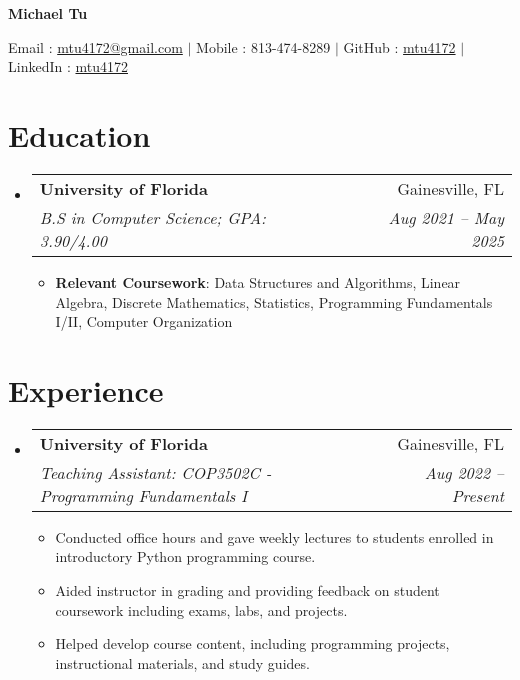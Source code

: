 \documentclass[letterpaper,11pt]{article}
\makeatletter
\newcommand{\resumeItem}[2]{
  \item\small{
    \textbf{#1}{: #2 \vspace{-2pt}}
  }
}
\newcommand{\resumeItemExperience}[1]{
  \item\small{
    {#1 \vspace{-2pt}}
  }
}
\newcommand{\resumeSubheading}[4]{
  \vspace{-1pt}\item
    \begin{tabular*}{0.97\textwidth}{l@{\extracolsep{\fill}}r}
      \textbf{#1} & #2 \\
      \textit{\small#3} & \textit{\small #4} \\
    \end{tabular*}\vspace{-6pt}
}
\newcommand{\resumeSubHeadingListStart}{\begin{itemize}[leftmargin=*, label={}]}
\newcommand{\resumeSubHeadingListEnd}{\end{itemize}}
\newcommand{\resumeItemListStart}{\begin{itemize}}
\newcommand{\resumeItemListEnd}{\end{itemize}\vspace{-5pt}}
\makeatother
\begin{document}
    \centerline{\textbf{\huge Michael Tu}}\vspace{0.15cm}
    \centerline{Email : \href{mailto:}{mtu4172@gmail.com} $|$
    Mobile : 813-474-8289 $|$
    GitHub : \href{http://github.com/mtu4172}{mtu4172} $|$
    LinkedIn : \href{http://linkedin.com/in/mtu4172}{mtu4172}}

\section{Education}
  \resumeSubHeadingListStart
    \resumeSubheading
      {University of Florida}{Gainesville, FL}
      {B.S in Computer Science; GPA: 3.90/4.00}{Aug 2021 -- May 2025}
    \resumeItemListStart
        \resumeItem{Relevant Coursework}
            {Data Structures and Algorithms, Linear Algebra, Discrete Mathematics, Statistics, Programming Fundamentals I/II, Computer Organization}
    \resumeItemListEnd
  \resumeSubHeadingListEnd

\section{Experience}
  \resumeSubHeadingListStart
    \resumeSubheading
      {University of Florida}{Gainesville, FL}
      {Teaching Assistant: COP3502C - Programming Fundamentals I}{Aug 2022 -- Present}
      \resumeItemListStart
        \resumeItemExperience
          {Conducted office hours and gave weekly lectures to students enrolled in introductory Python programming course.}
        \resumeItemExperience
          {Aided instructor in grading and providing feedback on student coursework including exams, labs, and projects.}
        \resumeItemExperience
          {Helped develop course content, including programming projects, instructional materials, and study guides.}
        \resumeItemListEnd
      
  \resumeSubHeadingListEnd

\end{document}
